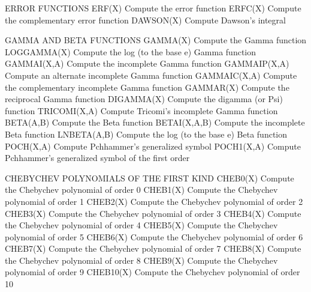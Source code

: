 ERROR FUNCTIONS
   ERF(X)         Compute the error function
   ERFC(X)        Compute the complementary error function
   DAWSON(X)      Compute Dawson's integral
 
GAMMA AND BETA FUNCTIONS
   GAMMA(X)       Compute the Gamma function
   LOGGAMMA(X)    Compute the log (to the base e) Gamma function
   GAMMAI(X,A)    Compute the incomplete Gamma function
   GAMMAIP(X,A)   Compute an alternate incomplete Gamma function
   GAMMAIC(X,A)   Compute the complementary incomplete Gamma function
   GAMMAR(X)      Compute the reciprocal Gamma function
   DIGAMMA(X)     Compute the digamma (or Psi) function
   TRICOMI(X,A)   Compute Tricomi's incomplete Gamma function
   BETA(A,B)      Compute the Beta function
   BETAI(X,A,B)   Compute the incomplete Beta function
   LNBETA(A,B)    Compute the log (to the base e) Beta function
   POCH(X,A)      Compute Pchhammer's generalized symbol
   POCH1(X,A)     Compute Pchhammer's generalized symbol of the first
                  order
 
CHEBYCHEV POLYNOMIALS OF THE FIRST KIND
   CHEB0(X)       Compute the Chebychev polynomial of order 0
   CHEB1(X)       Compute the Chebychev polynomial of order 1
   CHEB2(X)       Compute the Chebychev polynomial of order 2
   CHEB3(X)       Compute the Chebychev polynomial of order 3
   CHEB4(X)       Compute the Chebychev polynomial of order 4
   CHEB5(X)       Compute the Chebychev polynomial of order 5
   CHEB6(X)       Compute the Chebychev polynomial of order 6
   CHEB7(X)       Compute the Chebychev polynomial of order 7
   CHEB8(X)       Compute the Chebychev polynomial of order 8
   CHEB9(X)       Compute the Chebychev polynomial of order 9
   CHEB10(X)      Compute the Chebychev polynomial of order 10
 
